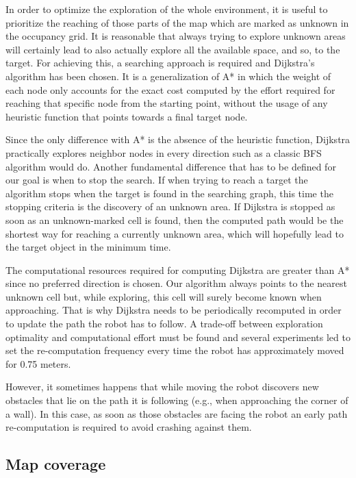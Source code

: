 \documentclass[9pt,conference]{IEEEtran}
\begin{document}
In order to optimize the exploration of the whole environment, it is useful to prioritize the reaching of those parts of the map which are marked as unknown in the occupancy grid. It is reasonable that always trying to explore unknown areas will certainly lead to also actually explore all the available space, and so, to the target. For achieving this, a searching approach is required and Dijkstra's algorithm \cite{wiki-dijkstra} has been chosen. It is a generalization of A* in which the weight of each node only accounts for the exact cost computed by the effort required for reaching that specific node from the starting point, without the usage of any heuristic function that points towards a final target node. 

Since the only difference with A* is the absence of the heuristic function, Dijkstra practically explores neighbor nodes in every direction such as a classic BFS algorithm \cite{wiki-bfs} would do. Another fundamental difference that has to be defined for our goal is when to stop the search. If when trying to reach a target the algorithm stops when the target is found in the searching graph, this time the stopping criteria is the discovery of an unknown area. If Dijkstra is stopped as soon as an unknown-marked cell is found, then the computed path would be the shortest way for reaching a currently unknown area, which will hopefully lead to the target object in the minimum time.

The computational resources required for computing Dijkstra are greater than A* since no preferred direction is chosen. Our algorithm always points to the nearest unknown cell but, while exploring, this cell will surely become known when approaching. That is why Dijkstra needs to be periodically recomputed in order to update the path the robot has to follow. A trade-off between exploration optimality and computational effort must be found and several experiments led to set the re-computation frequency every time the robot has approximately moved for 0.75 meters.

However, it sometimes happens that while moving the robot discovers new obstacles that lie on the path it is following (e.g., when approaching the corner of a wall). In this case, as soon as those obstacles are facing the robot an early path re-computation is required to avoid crashing against them.


\subsection{Map coverage}
\label{sec:coverage-exploration}
\end{document}
